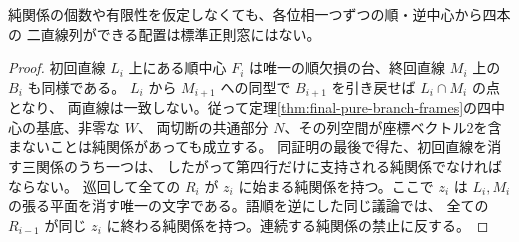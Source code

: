 \begin{corollary}\label{cor:four-two-line-impossible-with-pure}
純関係の個数や有限性を仮定しなくても、各位相一つずつの順・逆中心から四本の
二直線列ができる配置は標準正則窓にはない。
\end{corollary}
\begin{proof}
初回直線 $L_i$ 上にある順中心 $F_i$ は唯一の順欠損の台、終回直線 $M_i$ 上の $B_i$ も同様である。
$L_i$ から $M_{i+1}$ への同型で $B_{i+1}$ を引き戻せば $L_i\cap M_i$ の点となり、
両直線は一致しない。従って定理\ref{thm:final-pure-branch-frames}の四中心の基底、非零な $W$、
両切断の共通部分 $N$、その列空間が座標ベクトル2を含まないことは純関係があっても成立する。
同証明の最後で得た、初回直線を消す三関係のうち一つは、
したがって第四行だけに支持される純関係でなければならない。
巡回して全ての $R_i$ が $z_i$ に始まる純関係を持つ。ここで $z_i$ は
$L_i,M_i$ の張る平面を消す唯一の文字である。語順を逆にした同じ議論では、
全ての $R_{i-1}$ が同じ $z_i$ に終わる純関係を持つ。連続する純関係の禁止に反する。
\end{proof}
